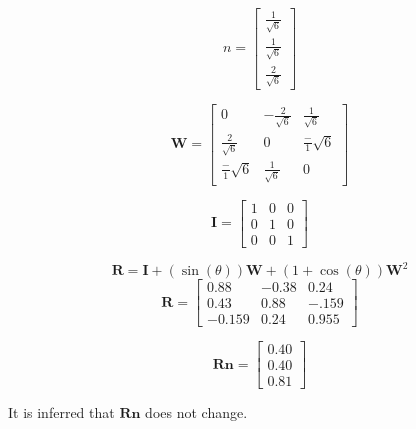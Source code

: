 \begin{problem}
    \normalfont
    $$
        n = \begin{bmatrix}
        \frac{1}{\sqrt{ 6 }} \\
        \frac{1}{\sqrt{ 6 }} \\
        \frac{2}{\sqrt{ 6 }}
        \end{bmatrix}
        $$
        
        $$
        \mathbf{W}=
        \begin{bmatrix}
        0 & -\frac{2}{\sqrt{ 6 }} & \frac{1}{\sqrt{ 6 }} \\
        \frac{2}{\sqrt{ 6 }} & 0 & \frac-{1}{\sqrt{ 6 }} \\
        \frac-{1}{\sqrt{ 6 }} & \frac{1}{\sqrt{ 6 }} & 0
        \end{bmatrix}
        $$
        
        $$
        \mathbf{I}= \begin{bmatrix}
        1 & 0 & 0 \\
        0 & 1 & 0 \\
        0 & 0 & 1
        \end{bmatrix}
        $$
        
        $$
        \mathbf{R} = \mathbf{I}+(\sin(\theta))\mathbf{W}+(1+\cos(\theta))\mathbf{W}^2
        $$
        $$
        \mathbf{R}=\begin{bmatrix}
        0.88 & -0.38 & 0.24 \\
        0.43 & 0.88 & -.159 \\
        -0.159 & 0.24 & 0.955
        \end{bmatrix}
        $$
        
        $$
        \mathbf{R}\mathbf{n}=\begin{bmatrix}
        0.40 \\
        0.40 \\
        0.81
        \end{bmatrix}
        $$

        It is inferred that $\mathbf{R}\mathbf{n}$ does not change.
\end{problem}
